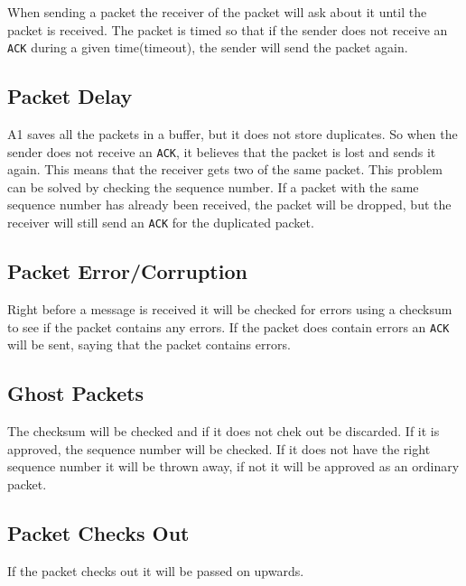 \documentclass{article}
\begin{document}
When sending a packet the receiver of the packet will ask about it until the
packet is received. The packet is timed so that if the sender does not
receive an \texttt{ACK} during a given time(timeout), the sender will send
the packet again.

\subsection{Packet Delay}

A1 saves all the packets in a buffer, but it does not store duplicates. So
when the sender does not receive an \texttt{ACK}, it believes that the
packet is lost and sends it again. This means that the receiver gets two of
the same packet. This problem can be solved by checking the sequence number.
If a packet with the same sequence number has already been received, the
packet will be dropped, but the receiver will still send an \texttt{ACK} for
the duplicated packet.

\subsection{Packet Error/Corruption}

Right before a message is received it will be checked for errors using a
checksum to see if the packet contains any errors. If the packet does
contain errors an \texttt{ACK} will be sent, saying that the packet contains
errors.

\subsection{Ghost Packets}

The checksum will be checked and if it does not chek out be discarded. If it
is approved, the sequence number will be checked. If it does not have the
right sequence number it will be thrown away, if not it will be approved as
an ordinary packet.

\subsection{Packet Checks Out}

If the packet checks out it will be passed on upwards.
\end{document}
